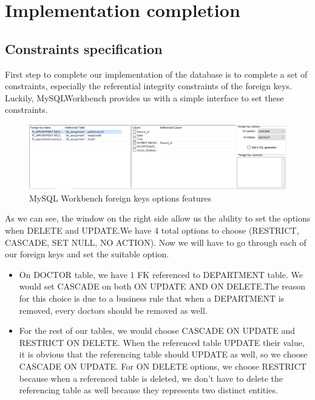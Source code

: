 \section{Implementation completion}

\subsection{Constraints specification}
First step to complete our implementation of the database is to complete a set of constraints, especially the referential integrity constraints of the foreign keys. Luckily, MySQLWorkbench provides us with a simple interface to set these constraints.

\begin{figure}[H]
  \centering
  \includegraphics[width = 12cm]{assets/constraints_1.png}
  \captionsetup{justification=centering,margin=2cm}
  \caption{MySQL Workbench foreign keys options features}
\end{figure}

As we can see, the window on the right side allow us the ability to set the options when DELETE and UPDATE.We have 4 total options to choose (RESTRICT, CASCADE, SET NULL, NO ACTION). Now we will have to go through each of our foreign keys and set the suitable option.

\begin{itemize}
  \item On DOCTOR table, we have 1 FK referenced to DEPARTMENT table. We would set CASCADE on both ON UPDATE AND ON DELETE.The reason for this choice is due to a business rule that when a DEPARTMENT is removed, every doctors should be removed as well.
  \item For the rest of our tables, we would choose CASCADE ON UPDATE and RESTRICT ON DELETE\@. When the referenced table UPDATE their value, it is obvious that the referencing table should UPDATE as well, so we choose CASCADE ON UPDATE\@. For ON DELETE options, we choose RESTRICT because when a referenced table is deleted, we don't have to delete the referencing table as well because they represents two distinct entities.
\end{itemize}

